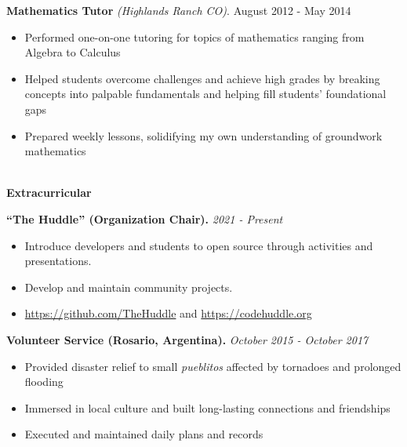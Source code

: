 \documentclass[letterpaper,11pt]{article}
\begin{document}
\textbf{Mathematics Tutor} \textit{(Highlands Ranch CO)}. \hfill August 2012 - May 2014
\begin{itemize}[noitemsep,topsep=0pt]
	\item Performed one-on-one tutoring for topics of mathematics ranging from Algebra to Calculus
	\item Helped students overcome challenges and achieve high grades by breaking concepts into palpable fundamentals and helping fill students' foundational gaps
	\item Prepared weekly lessons, solidifying my own understanding of groundwork mathematics\\
\end{itemize}




\begin{Large}\textbf{\\Extracurricular}\end{Large}

\textbf{``The Huddle'' (Organization Chair).} \textit{2021 - Present}
\begin{itemize}[noitemsep,topsep=0pt]
	\item Introduce developers and students to open source through activities and presentations.
	\item Develop and maintain community projects.
	\item \url{https://github.com/TheHuddle} and \url{https://codehuddle.org}\\
\end{itemize}

\textbf{Volunteer Service (Rosario, Argentina).} \textit{October 2015 - October 2017}
\begin{itemize}[noitemsep,topsep=0pt]
	\item Provided disaster relief to small \textit{pueblitos} affected by tornadoes and prolonged flooding
	\item Immersed in local culture and built long-lasting connections and friendships
	\item Executed and maintained daily plans and records\\
\end{itemize}
\end{document}
